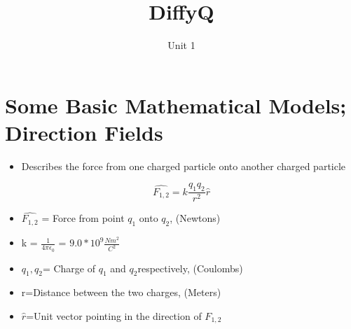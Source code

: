 \documentclass{article}
\title{DiffyQ}
\date{\vspace{-5ex}}
\author{Unit 1}
\begin{document}
\maketitle

\section{Some Basic Mathematical Models; Direction Fields} 
\begin{itemize}
	\item Describes the force from one charged particle onto another charged particle
\end{itemize}
		\[
	\hat{F_{1,2}}=k\frac{q_1q_2}{r^2}\hat{r}
\]
\begin{itemize}
	\item $\hat{F_{1,2}}$ = Force from point $q_1$ onto $q_2$, (Newtons)\\
	\item k = $\frac{1}{4\pi\epsilon_0}$ = $9.0*10^9\frac{Nm^2}{C^2}$\\
	\item $q_1,q_2$= Charge of $q_1$ and $q_2$respectively, (Coulombs)\\
	\item r=Distance between the two charges, (Meters)\\
	\item $\hat{r}$=Unit vector pointing in the direction of $F_{1,2}$
\end{itemize}
\end{document}
